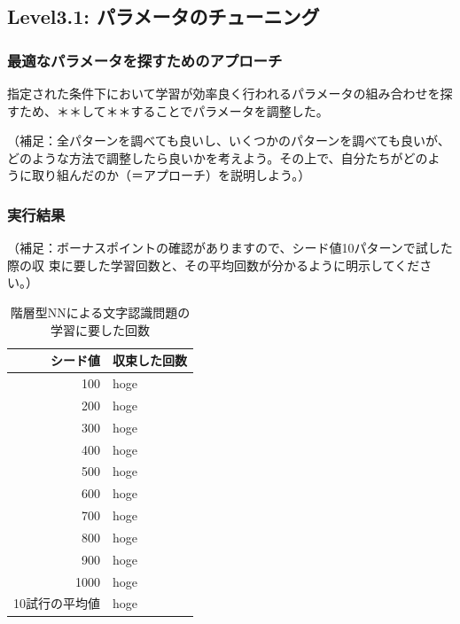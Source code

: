 \subsection{Level3.1: パラメータのチューニング}
\subsubsection{最適なパラメータを探すためのアプローチ}
指定された条件下において学習が効率良く行われるパラメータの組み合わせを探
すため、＊＊して＊＊することでパラメータを調整した。

（補足：全パターンを調べても良いし、いくつかのパターンを調べても良いが、
どのような方法で調整したら良いかを考えよう。その上で、自分たちがどのよ
うに取り組んだのか（＝アプローチ）を説明しよう。）

\subsubsection{実行結果}

（補足：ボーナスポイントの確認がありますので、シード値10パターンで試した際の収
束に要した学習回数と、その平均回数が分かるように明示してください。）
\begin{table}[htb]
 \begin{center}
  \caption{階層型NNによる文字認識問題の学習に要した回数}
  \label{table:level3}
  \begin{tabular}[htb]{r|l} \hline
   シード値 & 収束した回数 \\ \hline \hline
   100 & hoge \\ \hline
   200 & hoge \\ \hline
   300 & hoge \\ \hline
   400 & hoge \\ \hline
   500 & hoge \\ \hline
   600 & hoge \\ \hline
   700 & hoge \\ \hline
   800 & hoge \\ \hline
   900 & hoge \\ \hline
   1000 & hoge \\ \hline \hline
   10試行の平均値 & hoge \\ \hline
  \end{tabular}
 \end{center}
\end{table}

